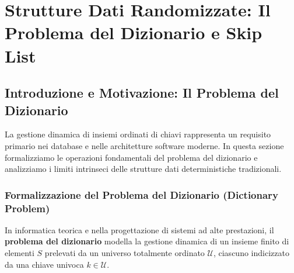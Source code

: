 \chapter{Strutture Dati Randomizzate: Il Problema del Dizionario e Skip List}
\label{chap:randomized-data-structures}

\FloatBarrier
\section{Introduzione e Motivazione: Il Problema del Dizionario}
\label{sec:dictionary-problem-and-motivation}

La gestione dinamica di insiemi ordinati di chiavi rappresenta un requisito primario nei database e nelle architetture software moderne. In questa sezione formalizziamo le operazioni fondamentali del problema del dizionario e analizziamo i limiti intrinseci delle strutture dati deterministiche tradizionali.

\FloatBarrier
\subsection{Formalizzazione del Problema del Dizionario (Dictionary Problem)}
In informatica teorica e nella progettazione di sistemi ad alte prestazioni, il \textbf{problema del dizionario} modella la gestione dinamica di un insieme finito di elementi $S$ prelevati da un universo totalmente ordinato $\mathcal{U}$, ciascuno indicizzato da una chiave univoca $k \in \mathcal{U}$.

